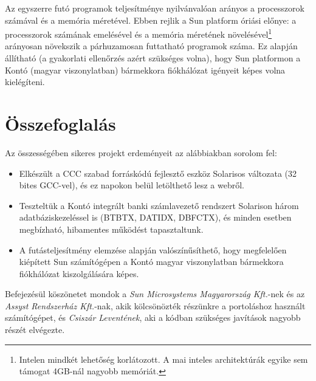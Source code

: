 Az egyszerre futó programok teljesítménye nyilvánvalóan arányos
a processzorok számával és a memória méretével. 
Ebben rejlik a Sun platform óriási előnye:
a processzorok számának emelésével és a memória méretének
növelésével\footnote{
Intelen mindkét lehetőség korlátozott. A mai inteles architektúrák
egyike sem támogat 4GB-nál nagyobb memóriát.}
arányosan növekszik a párhuzamosan futtatható programok száma. 
Ez alapján állítható (a gyakorlati ellenőrzés azért szükséges volna), 
hogy Sun platformon a Kontó (magyar viszonylatban) bármekkora fiókhálózat 
igényeit képes volna kielégíteni.


\section{Összefoglalás}

Az összességében sikeres projekt erdeményeit az alábbiakban 
sorolom fel:

\begin{itemize}
\item 
   Elkészült a CCC szabad forráskódú fejlesztő eszköz Solarisos
   változata (32 bites GCC-vel), és ez napokon belül letölthető
   lesz a webről.
\item
   Teszteltük a Kontó integrált banki számlavezető rendszert
   Solarison három adatbáziskezeléssel is (BTBTX, DATIDX, DBFCTX),
   és minden esetben megbízható, hibamentes működést tapasztaltunk.
\item
   A futásteljesítmény elemzése alapján valószínűsíthető,
   hogy megfelelően kiépített Sun számítógépen a Kontó
   magyar viszonylatban bármekkora fiókhálózat kiszolgálására képes.
\end{itemize}
 
Befejezésül köszönetet mondok 
a  \emph{Sun Microsystems Magyarország Kft.}-nek és 
az \emph{Assyst Rendszerház Kft.}-nak, 
akik kölcsönözték részünkre a portoláshoz használt számítógépet, 
és \emph{Csiszár Leventének}, aki a kódban  szükséges
javítások nagyobb részét elvégezte.

 
 